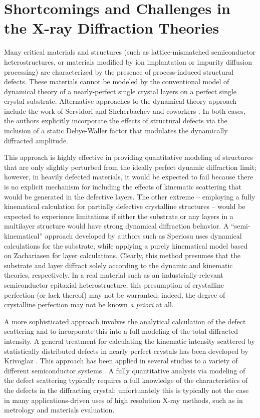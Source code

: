	\section{Shortcomings and Challenges in the X-ray Diffraction Theories}


Many critical materials and structures (such as lattice-mismatched semiconductor heterostructures, or materials modified by ion implantation or impurity diffusion processing) are characterized by the presence of process-induced structural defects.  These materials cannot be modeled by the conventional model of dynamical theory of a nearly-perfect single crystal layers on a perfect single crystal substrate. Alternative approaches to the dynamical theory approach include the work of Servidori \cite{Servidori1} and Shcherbachev and coworkers \cite{Shcher1}.  In both cases, the authors explicitly incorporate the effects of structural defects via the inclusion of a static Debye-Waller factor that modulates the dynamically diffracted amplitude.

This approach is highly effective in providing quantitative modeling of structures that are only slightly perturbed from the ideally perfect dynamic diffraction limit; however, in heavily defected materials, it would be expected to fail because there is no explicit mechanism for including the effects of kinematic scattering that would be generated in the defective layers.  The other extreme -- employing a fully kinematical calculation for partially defective crystalline structures -- would be expected to experience limitations if either the substrate or any layers in a multilayer structure would have strong dynamical diffraction behavior.  A ``semi-kinematical'' approach developed by authors such as Speriosu \cite{Speriosu2,Speriosu1} uses dynamical calculations for the substrate, while applying a purely kinematical model based on Zachariasen  \cite{Zachariasen1} for layer calculations. Clearly, this method presumes that the substrate and layer diffract solely according to the dynamic and kinematic theories, respectively. In a real material such as an industrially-relevant semiconductor epitaxial heterostructure, this presumption of crystalline perfection (or lack thereof) may not be warranted; indeed, the degree of crystalline perfection may not be known \textit{a priori} at all.

A more sophisticated approach involves the analytical calculation of the defect scattering and to incorporate this into a full modeling of the total diffracted intensity. A general treatment for calculating the kinematic intensity scattered by statistically distributed defects in nearly perfect crystals has been developed by Krivoglaz \cite{Krivoglaz1}. This approach has been applied in several studies to a variety of different semiconductor systems \cite{Gartstein1,Zaumseil1,Kaganer1,Holy3}. A fully quantitative analysis via modeling of the defect scattering typically requires a full knowledge of the characteristics of the defects in the diffracting crystal; unfortunately this is typically not the case in many applications-driven uses of high resolution X-ray methods, such as in metrology and materials evaluation.



